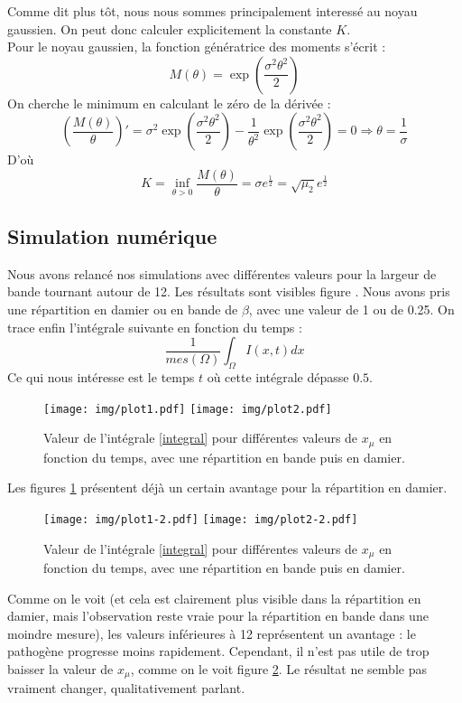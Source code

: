 \documentclass{article}
\begin{document}
\clearpage
Comme dit plus tôt, nous nous sommes principalement interessé au noyau gaussien. On peut donc calculer explicitement la constante $K$.\\
Pour le noyau gaussien, la fonction génératrice des moments s'écrit :
	\[M(\theta)=\exp\left( \frac{\sigma^2\theta^2}{2}\right)\]
On cherche le minimum en calculant le zéro de la dérivée :
\[\left( \frac{M(\theta)}{\theta}\right)'=\sigma^2 \exp\left( \frac{\sigma^2\theta^2}{2}\right) - \frac{1}{\theta^2} \exp\left( \frac{\sigma^2\theta^2}{2}\right) = 0 \Rightarrow \theta=\frac{1}{\sigma}\]
D'où \[K=\inf_{\theta>0} \frac{M(\theta)}{\theta} = \sigma e^{\frac{1}{2}}= \sqrt{\mu_2}e^{\frac{1}{2}}\]

\subsection{Simulation numérique}
Nous avons relancé nos simulations avec différentes valeurs pour la largeur de bande tournant autour de 12. Les résultats sont visibles figure \label{figProp1}. Nous avons pris une répartition en damier ou en bande de $\beta$, avec une valeur de 1 ou de 0.25. On trace enfin l'intégrale suivante en fonction du temps :
\begin{equation}\label{integral}
	\frac{1}{mes(\Omega)}\int_\Omega I(x,t) dx
\end{equation}
Ce qui nous intéresse est le temps $t$ où cette intégrale dépasse $0.5$.
\begin{figure}[!h]
\centering
	\texttt{[image: img/plot1.pdf]}
	\texttt{[image: img/plot2.pdf]}
\caption{Valeur de l'intégrale \ref{integral} pour différentes valeurs de $x_{\mu}$ en fonction du temps, avec une répartition en bande puis en damier.}
\label{figProp1}
\end{figure}

Les figures \ref{figProp1} présentent déjà un certain avantage pour la répartition en damier. 

\begin{figure}[!h]
\centering
	\texttt{[image: img/plot1-2.pdf]}
	\texttt{[image: img/plot2-2.pdf]}
\caption{Valeur de l'intégrale \ref{integral} pour différentes valeurs de $x_{\mu}$ en fonction du temps, avec une répartition en bande puis en damier.}
\label{figProp2}
\end{figure}

Comme on le voit (et cela est clairement plus visible dans la répartition en damier, mais l'observation reste vraie pour la répartition en bande dans une moindre mesure), les valeurs inférieures à 12 représentent un avantage : le pathogène progresse moins rapidement. Cependant, il n'est pas utile de trop baisser la valeur de $x_{\mu}$, comme on le voit figure \ref{figProp2}. Le résultat ne semble pas vraiment changer, qualitativement parlant.
\end{document}
